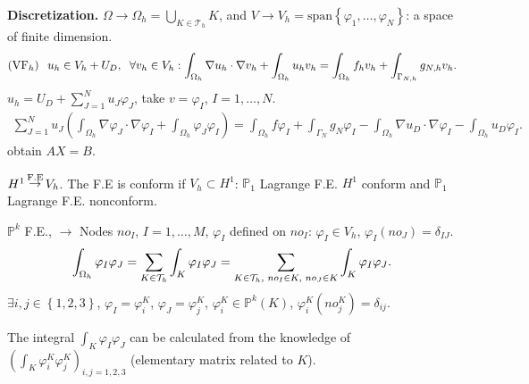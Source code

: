 \documentclass[11pt,a4paper,center,notitlepage]{article}
\numberwithin{equation}{section}
\begin{document}
\textbf{Discretization.} $\Omega  \to {\Omega _h} = \bigcup\nolimits_{K \in {\mathcal{T}_h}} K $, and $V \to {V_h} = \mbox{span}\left\{ {{\varphi _1}, \ldots ,{\varphi _N}} \right\}$: a space of finite dimension.
\begin{align*}
\left( {\rm VF}_h \right) \hspace{2mm} {u_h} \in {V_h} + {U_D}, \hspace{2mm} \forall {v_h} \in {V_h}:\int_{{\Omega _h}} {\nabla {u_h} \cdot \nabla {v_h}}  + \int_{{\Omega _h}} {{u_h}{v_h}}  = \int_{{\Omega _h}} {{f_h}{v_h}}  + \int_{{\Gamma _{N,h}}} {{g_{N,h}}{v_h}} .
\end{align*}
${u_h} = {U_D} + \sum\limits_{J = 1}^N {{u_J}{\varphi _J}} $, take $v=\varphi _I$, $I=1,\ldots,N$.
\begin{align*}
\sum\limits_{J = 1}^N {{u_J}\left( {\int_{{\Omega _h}} {\nabla {\varphi _J} \cdot \nabla {\varphi _I}}  + \int_{{\Omega _h}} {{\varphi _J}{\varphi _I}} } \right)}  = \int_{{\Omega _h}} {f{\varphi _I}}  + \int_{{\Gamma _N}} {{g_N}{\varphi _I}}  - \int_{{\Omega _h}} {\nabla {u_D} \cdot \nabla {\varphi _I}}  - \int_{{\Omega _h}} {{u_D}{\varphi _I}} .
\end{align*}
obtain $AX=B$. 

${H^1}\mathop  \to \limits^{\rm F.E} {V_h}$. The F.E is conform if $V_h\subset H^1$: $\mathbb{P}_1$ Lagrange F.E. $H^1$ conform and $\mathbb{P}_1$ Lagrange F.E. nonconform. 

$\mathbb{P}^k$ F.E., $\to$ Nodes $no_I$, $I=1,\ldots,M$, $\varphi _I$ defined on $no_I$: $\varphi _I \in V_h$, $\varphi _I\left(no_J\right) =\delta _{IJ}$.
\begin{align}
\int_{{\Omega _h}} {{\varphi _I}{\varphi _J}}  = \sum\limits_{K \in {\mathcal{T}_h}} {\int_K {{\varphi _I}{\varphi _J}} }  = \sum\limits_{K \in {\mathcal{T}_h}, \hspace{1mm} n{o_I} \in K,\hspace{1mm} n{o_J} \in K} {\int_K {{\varphi _I}{\varphi _J}} } .
\end{align}
$\exists i,j \in \left\{ {1,2,3} \right\}$, ${\varphi _I} = \varphi _i^K$, ${\varphi _J} = \varphi _j^K$, $\varphi _i^K \in {\mathbb{P}^k}\left( K \right)$, $\varphi _i^K\left( {no_j^K} \right) = {\delta _{ij}}$.

The integral ${\int_K {{\varphi _I}{\varphi _J}} }$ can be calculated from the knowledge of $\left( {\int_K {\varphi _i^K\varphi _j^K} } \right)_{i,j = 1,2,3}$ (elementary matrix related to $K$).
\end{document}
